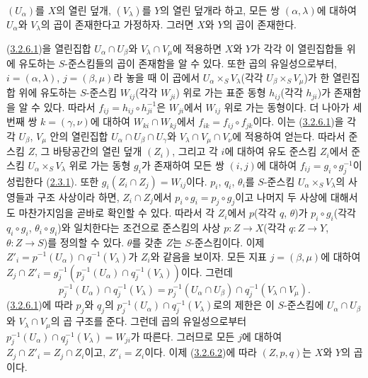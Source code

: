 \begin{lemma}[3.2.6.3]
\label{I.3.2.6.3-ko}
$(U_\alpha)$를 $X$의 열린 덮개, $(V_\lambda)$를 $Y$의 열린 덮개라
하고, 모든 쌍 $(\alpha,\lambda)$에 대하여 $U_\alpha$와
$V_\lambda$의 곱이 존재한다고 가정하자. 그러면 $X$와 $Y$의 곱이
존재한다.
\end{lemma}

(\hyperref[I.3.2.6.1-ko]{3.2.6.1})을 열린집합
$U_\alpha\cap U_\beta$와 $V_\lambda\cap V_\mu$에 적용하면 $X$와
$Y$가 각각 이 열린집합들 위에 유도하는 $S$-준스킴들의 곱이
존재함을 알 수 있다. 또한 곱의 유일성으로부터, $i=(\alpha,\lambda)$,
$j=(\beta,\mu)$라 놓을 때 이 곱에서
$U_\alpha\times_S V_\lambda$(각각 $U_\beta\times_S V_\mu$)가 한
열린집합 위에 유도하는 $S$-준스킴 $W_{ij}$(각각 $W_{ji}$) 위로 가는
표준 동형 $h_{ij}$(각각 $h_{ji}$)가 존재함을 알 수 있다. 따라서
$f_{ij}=h_{ij}\circ h_{ji}^{-1}$은 $W_{ji}$에서 $W_{ij}$ 위로 가는
동형이다. 더 나아가 세 번째 쌍 $k=(\gamma,\nu)$에 대하여
$W_{ki}\cap W_{kj}$에서 $f_{ik}=f_{ij}\circ f_{jk}$이다. 이는
(\hyperref[I.3.2.6.1-ko]{3.2.6.1})을 각각 $U_\beta$, $V_\mu$ 안의
열린집합 $U_\alpha\cap U_\beta\cap U_\gamma$와
$V_\lambda\cap V_\mu\cap V_\nu$에 적용하여 얻는다. 따라서 준스킴
$Z$, 그 바탕공간의 열린 덮개 $(Z_i)$, 그리고 각 $i$에 대하여 유도
준스킴 $Z_i$에서 준스킴 $U_\alpha\times_S V_\lambda$ 위로 가는
동형 $g_i$가 존재하여 모든 쌍 $(i,j)$에 대하여
$f_{ij}=g_i\circ g_j^{-1}$이 성립한다
(\hyperref[I.2.3.1-ko]{2.3.1}). 또한
$g_i(Z_i\cap Z_j)=W_{ij}$이다. $p_i$, $q_i$, $\theta_i$를
$S$-준스킴 $U_\alpha\times_S V_\lambda$의 사영들과 구조 사상이라
하면, $Z_i\cap Z_j$에서 $p_i\circ g_i=p_j\circ g_j$이고 나머지 두
사상에 대해서도 마찬가지임을 곧바로 확인할 수 있다. 따라서 각
$Z_i$에서 $p$(각각 $q$, $\theta$)가 $p_i\circ g_i$(각각
$q_i\circ g_i$, $\theta_i\circ g_i$)와 일치한다는 조건으로 준스킴의
사상 $p:Z\to X$(각각 $q:Z\to Y$, $\theta:Z\to S$)를 정의할 수
있다. $\theta$를 갖춘 $Z$는 $S$-준스킴이다. 이제
$Z'_i=p^{-1}(U_\alpha)\cap q^{-1}(V_\lambda)$가 $Z_i$와 같음을
보이자. 모든 지표 $j=(\beta,\mu)$에 대하여
$Z_j\cap Z'_i=g_j^{-1}(p_j^{-1}(U_\alpha)\cap q_j^{-1}(V_\lambda))$이다.
그런데
\[
  p_j^{-1}(U_\alpha)\cap q_j^{-1}(V_\lambda)
  =p_j^{-1}(U_\alpha\cap U_\beta)\cap
   q_j^{-1}(V_\lambda\cap V_\mu).
\]
(\hyperref[I.3.2.6.1-ko]{3.2.6.1})에 따라 $p_j$와 $q_j$의
$p_j^{-1}(U_\alpha)\cap q_j^{-1}(V_\lambda)$로의 제한은 이
$S$-준스킴에 $U_\alpha\cap U_\beta$와 $V_\lambda\cap V_\mu$의 곱
구조를 준다. 그런데 곱의 유일성으로부터
$p_j^{-1}(U_\alpha)\cap q_j^{-1}(V_\lambda)=W_{ji}$가 따른다.
그러므로 모든 $j$에 대하여 $Z_j\cap Z'_i=Z_j\cap Z_i$이고,
$Z'_i=Z_i$이다. 이제 (\hyperref[I.3.2.6.2-ko]{3.2.6.2})에 따라
$(Z,p,q)$는 $X$와 $Y$의 곱이다.

